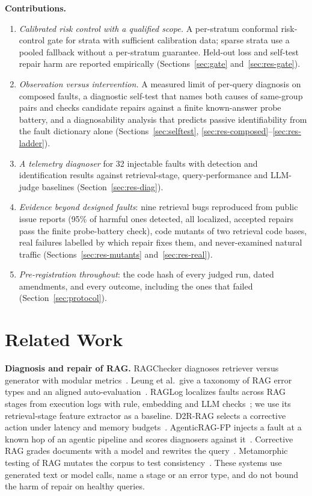 \documentclass[conference]{IEEEtran}
\begin{document}
\textbf{Contributions.}
\begin{enumerate}
\item \emph{Calibrated risk control with a qualified scope.} A per-stratum conformal risk-control gate for strata with sufficient calibration data; sparse strata use a pooled fallback without a per-stratum guarantee. Held-out loss and self-test repair harm are reported empirically (Sections~\ref{sec:gate} and~\ref{sec:res-gate}).
\item \emph{Observation versus intervention.} A measured limit of per-query diagnosis on composed faults, a diagnostic self-test that names both causes of same-group pairs and checks candidate repairs against a finite known-answer probe battery, and a diagnosability analysis that predicts passive identifiability from the fault dictionary alone (Sections~\ref{sec:selftest}, \ref{sec:res-composed}--\ref{sec:res-ladder}).
\item \emph{A telemetry diagnoser} for 32 injectable faults with detection and identification results against retrieval-stage, query-performance and LLM-judge baselines (Section~\ref{sec:res-diag}).
\item \emph{Evidence beyond designed faults}: nine retrieval bugs reproduced from public issue reports (95\% of harmful ones detected, all localized, accepted repairs pass the finite probe-battery check), code mutants of two retrieval code bases, real failures labelled by which repair fixes them, and never-examined natural traffic (Sections~\ref{sec:res-mutants} and~\ref{sec:res-real}).
\item \emph{Pre-registration throughout}: the code hash of every judged run, dated amendments, and every outcome, including the ones that failed (Section~\ref{sec:protocol}).
\end{enumerate}

\section{Related Work}
\textbf{Diagnosis and repair of RAG.} RAGChecker diagnoses retriever versus generator with modular metrics~\cite{ru2024ragchecker}. Leung et al.\ give a taxonomy of RAG error types and an aligned auto-evaluation~\cite{leung2026ragec}. RAGLog localizes faults across RAG stages from execution logs with rule, embedding and LLM checks~\cite{raglog}; we use its retrieval-stage feature extractor as a baseline. D2R-RAG selects a corrective action under latency and memory budgets~\cite{hashemifar2026d2r}. AgenticRAG-FP injects a fault at a known hop of an agentic pipeline and scores diagnosers against it~\cite{pothuru2026agenticfp}. Corrective RAG grades documents with a model and rewrites the query~\cite{yan2024crag}. Metamorphic testing of RAG mutates the corpus to test consistency~\cite{kim2026metamorphic}. These systems use generated text or model calls, name a stage or an error type, and do not bound the harm of repair on healthy queries.
\end{document}
